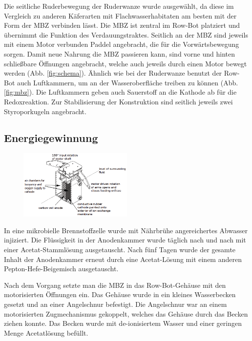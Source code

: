 \documentclass{SeminarV2}
\begin{document}
Die seitliche Ruderbewegung der Ruderwanze wurde ausgewählt, da diese im Vergleich zu anderen Käferarten mit Flachwasserhabitaten am besten mit der Form der MBZ verbinden lässt. Die MBZ ist zentral im Row-Bot platziert und übernimmt die Funktion des Verdauungstraktes. Seitlich an der MBZ sind jeweils mit einem Motor verbunden Paddel angebracht, die für die Vorwärtsbewegung sorgen. Damit neue Nahrung die MBZ passieren kann, sind vorne und hinten schließbare Öffnungen angebracht, welche auch jeweils durch einen Motor bewegt werden (Abb. \ref{fig:schema}). Ähnlich wie bei der Ruderwanze benutzt der Row-Bot auch Luftkammern, um an der Wasseroberfläche treiben zu können (Abb. \ref{fig:mbz}). Die Luftkammern geben auch Sauerstoff an die Kathode ab für die Redoxreaktion. Zur Stabilisierung der Konstruktion sind seitlich jeweils zwei Styroporkugeln angebracht.\cite[S. 3889 f.]{DBLP:conf/iros/PhilamoreRSI15}

\subsection{Energiegewinnung}\label{sec:energy}

\begin{figure}[ht]
\centering
\includegraphics[width=0.5\textwidth]{pics/mfc}
\end{figure}

In eine mikrobielle Brennstoffzelle wurde mit Nährbrühe angereichertes Abwasser injiziert. Die Flüssigkeit in der Anodenkammer wurde täglich nach und nach mit einer Acetat-Stammlösung ausgetauscht. Nach fünf Tagen wurde der gesamte Inhalt der Anodenkammer erneut durch eine Acetat-Lösung mit einem anderen Pepton-Hefe-Beigemisch ausgetauscht.\cite[S. 3890]{DBLP:conf/iros/PhilamoreRSI15}

Nach dem Vorgang setzte man die MBZ in das Row-Bot-Gehäuse mit den motorisierten Öffnungen ein. Das Gehäuse wurde in ein kleines Wasserbecken gesetzt und an einer Angelschnur befestigt. Die Angelschnur war an einem motorisierten Zugmechanismus gekoppelt, welches das Gehäuse durch das Becken ziehen konnte. Das Becken wurde mit de-ionisiertem Wasser und einer geringen Menge Acetatlösung befüllt.\cite[S. 3890]{DBLP:conf/iros/PhilamoreRSI15}
\end{document}
